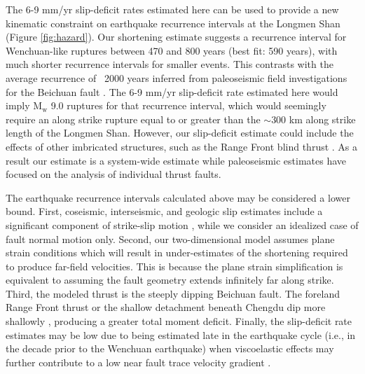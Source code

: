 \documentclass[12pt]{article}
\begin{document}
The 6-9 mm/yr slip-deficit rates estimated here can be used to provide a new kinematic constraint on earthquake recurrence intervals at the Longmen Shan (Figure \ref{fig:hazard}). Our shortening estimate suggests a recurrence interval for Wenchuan-like ruptures between 470 and 800 years (best fit: 590 years), with much shorter recurrence intervals for smaller events. This contrasts with the average recurrence of ~2000 years inferred from paleoseismic field investigations for the Beichuan fault \citep{Ran2010}. The 6-9 mm/yr slip-deficit rate estimated here would imply $\textrm{M}_{\textrm{w}}$ 9.0 ruptures for that recurrence interval, which would seemingly require an along strike rupture equal to or greater than the ${\sim}300$ km along strike length of the Longmen Shan. However, our slip-deficit estimate could include the effects of other imbricated structures, such as the Range Front blind thrust \citep{Hubbard2010, Wang2014}. As a result our estimate is a system-wide estimate while paleoseismic estimates have focused on the analysis of individual thrust faults. 

The earthquake recurrence intervals calculated above may be considered a lower bound. First, coseismic, interseismic, and geologic slip estimates include a significant component of strike-slip motion \citep{Shen2009a, Qi2011, Densmore2007, Meade2007, Loveless2011}, while we consider an idealized case of fault normal motion only. Second, our two-dimensional model assumes plane strain conditions which will result in under-estimates of the shortening required to produce far-field velocities. This is because the plane strain simplification is equivalent to assuming the fault geometry extends infinitely far along strike. Third, the modeled thrust is the steeply dipping Beichuan fault. The foreland Range Front thrust or the shallow detachment beneath Chengdu dip more shallowly \citep{Hubbard2010}, producing a greater total moment deficit. Finally, the slip-deficit rate estimates may be low due to being estimated late in the earthquake cycle (i.e., in the decade prior to the Wenchuan earthquake) when viscoelastic effects may further contribute to a low near fault trace velocity gradient \citep{savage00}.
\end{document}

